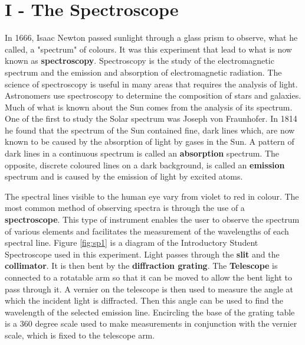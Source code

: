 \section{I - The Spectroscope}
In 1666, Isaac Newton passed sunlight through a glass prism to observe, what he called, a "spectrum" of colours. It was this experiment that lead to what is now known as {\bf spectroscopy}. Spectroscopy is the study of the electromagnetic spectrum and the emission and absorption of electromagnetic radiation. The science of spectroscopy is useful in many areas that requires the analysis of light. Astronomers use spectroscopy to determine the composition of stars and galaxies. Much of what is known about the Sun comes from the analysis of its spectrum. One of the first to study the Solar spectrum was Joseph von Fraunhofer. In 1814 he found that the spectrum of the Sun contained fine, dark lines which, are now known to be caused by the absorption of light by gases in the Sun. A pattern of dark lines in a continuous spectrum is called an {\bf absorption} spectrum. The opposite, discrete coloured lines on a dark background, is called an {\bf emission} spectrum and is caused by the emission of light by excited atoms.

The spectral lines visible to the human eye vary from violet to red in colour. The most common method of observing spectra is through the use of a {\bf spectroscope}. This type of instrument enables the user to observe the spectrum of various elements and facilitates the measurement of the wavelengths of each spectral line. Figure \ref{fig:sp1} is a diagram of the Introductory Student Spectroscope used in this experiment. Light passes through the {\bf slit} and the {\bf collimator}. It is then bent by the {\bf diffraction grating}. The {\bf Telescope} is connected to a rotatable arm so that it can be moved to allow the bent light to pass through it. A vernier on the telescope is then used to measure the angle at which the incident light is diffracted. Then this angle can be used to find the wavelength of the selected emission line. Encircling the base of the grating table is a 360 degree scale used to make measurements in conjunction with the vernier scale, which is fixed to the telescope arm.

